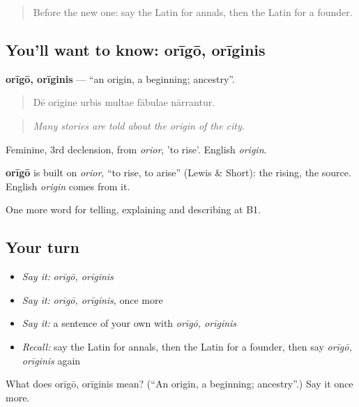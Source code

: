 \begin{quote}
Before the new one: say the Latin for annals, then the Latin for a founder.
\end{quote}

\subsection*{You'll want to know: orīgō, orīginis}
\textbf{orīgō, orīginis} — \textquotedblleft{}an origin, a beginning; ancestry\textquotedblright{}.

\begin{quote}
Dē orīgine urbis multae fābulae nārrantur.
\end{quote}

\begin{quote}
\emph{Many stories are told about the origin of the city.}
\end{quote}

Feminine, 3rd declension, from \emph{orior}, 'to rise'. English \emph{origin}.

\begin{cousinweb}
\textbf{orīgō} is built on \emph{orior}, \textquotedblleft{}to rise, to arise\textquotedblright{} (Lewis \& Short): the rising, the source. English \emph{origin} comes from it.
\end{cousinweb}

\begin{grammarlens}[title={What you've built}]
One more word for telling, explaining and describing at B1.
\end{grammarlens}

\subsection*{Your turn}
\begin{itemize}
\raggedright
  \item \emph{Say it:} \emph{orīgō, orīginis}
  \item \emph{Say it:} \emph{orīgō, orīginis}, once more
  \item \emph{Say it:} a sentence of your own with \emph{orīgō, orīginis}
  \item \emph{Recall:} say the Latin for annals, then the Latin for a founder, then say \emph{orīgō, orīginis} again
\end{itemize}

\begin{tcolorbox}[breakable,colback=teal!4,colframe=teal!35!black,title={Before you move on}]
What does orīgō, orīginis mean? (\textquotedblleft{}An origin, a beginning; ancestry\textquotedblright{}.) Say it once more.
\end{tcolorbox}
